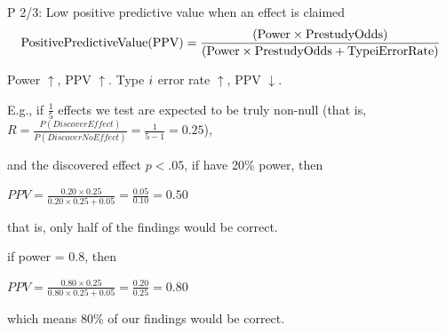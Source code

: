 \documentclass{beamer}
\begin{document}
	\begin{frame}{P 2/3: Low positive predictive value when an effect is claimed}
		~\\ \fontsize{9pt}{11pt}\selectfont
		\[\mathrm{Positive Predictive Value (PPV) = \frac{(Power \times Prestudy Odds)}{(Power \times Prestudy Odds + Type  \uppercase\expandafter{\romannumeral1} Error Rate)}}\]
		
		Power $\uparrow$, PPV $\uparrow$. Type $\uppercase\expandafter{\romannumeral1}$ error rate $\uparrow$, PPV $\downarrow$.
		
		E.g., if $\frac{1}{5}$ effects we test are expected to be truly non-null (that is, $R = \frac{P(Discover Effect)}{P(Discover No Effect)} = \frac{1}{5 - 1} = 0.25$), 
		
		and the discovered effect $p < .05$, if have 20\% power, then 
		
		$PPV = \frac{0.20 \times 0.25}{0.20 \times 0.25 + 0.05} = \frac{0.05}{0.10} = 0.50$ 
		
		that is, only half of the findings would be correct.
		
		if power = 0.8, then 
		
		$PPV = \frac{0.80 \times 0.25}{0.80 \times 0.25 + 0.05} = \frac{0.20}{0.25} = 0.80$  
		
		which means 80\% of our findings would be correct. 
	\end{frame}
	
\end{document}
